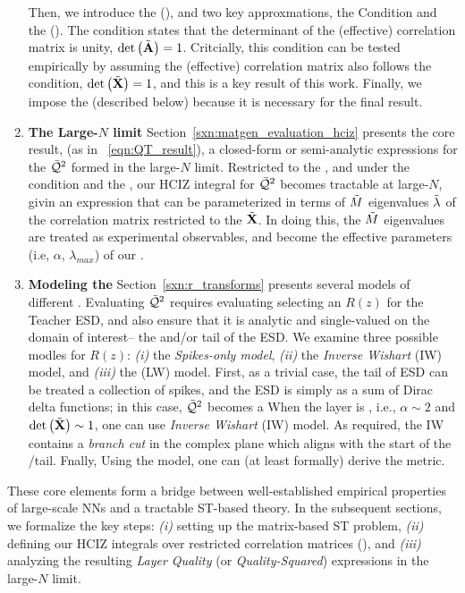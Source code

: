 \begin{enumerate}[label=5.\arabic*]
Then, we introduce the \EffectiveCorrelationSpace (\ECS), and two key approxmations,
the \TRACELOG Condition and the \IndependentFluctuationApproximation (\IFA).
The \TRACELOG condition states that the determinant of the (effective) \Student correlation matrix is unity, $\mbox{}{\text{det}}\left(\tilde{\mathbf{A}}\right)=1$.
Critcially, this condition can be tested empirically by assuming the (effective) \Teacher correlation matrix
also follows the \TRACELOG condition, $\mbox{}{\text{det}}\left(\tilde{\mathbf{X}}\right)=1$, and this is a key result of this work.
Finally, we impose the \IFA (described below) because it is necessary for the final result.

\item
\textbf{The Large-$N$ limit}
Section~\ref{sxn:matgen_evaluation_hciz} presents the core result,
(as in \EQN~\ref{eqn:QT_result}),
a closed-form or semi-analytic expressions for the \LayerQualitySquared $\bar{\mathcal{Q}}^{2}$
formed in the large-$N$ limit.
Restricted to the \ECS, and under  the \TRACELOG condition and the \IFA, our
HCIZ integral for $\bar{\mathcal{Q}}^{2}$ becomes tractable at large-$N$, givin an expression that can be parameterized
in terms of $\tilde{M}$ eigenvalues $\tilde{\lambda}$ of the \Teacher correlation matrix 
restricted to the \ECS $\tilde{\mathbf{X}}$.
In doing this, the $\tilde{M}$ \Teacher eigenvalues are treated as experimental observables, and 
become the effective \SemiEmpirical parameters (i.e, $\alpha$, $\lambda_{max}$) of our \SETOL.

\item
\textbf{Modeling the \HeavyTailed \RTransform}
Section~\ref{sxn:r_transforms} presents several  models of different \RTransforms.
Evaluating $\bar{\mathcal{Q}}^{2}$ requires evaluating selecting an \RTransform $R(z)$ for the Teacher ESD,
and also ensure that it is analytic and single-valued on the domain of interest-- the \ECS and/or tail of the ESD.
We examine three possible modles for $R(z)$: \emph{(i)} the \emph{Spikes-only model},
\emph{(ii)} the \emph{Inverse Wishart} (IW) model, 
and \emph{(iii)} the  \LevyWigner (LW) model.
First, as a trivial case, the tail of ESD can be treated a collection of spikes,
and the ESD is simply as a sum of Dirac delta functions; in this case,
$\bar{\mathcal{Q}}^{2}$ becomes a 
When the layer is \Ideal, i.e., $\alpha\sim 2$ and $\mbox{}{\text{det}}\left(\tilde{\mathbf{X}}\right)\sim 1$,
one can use  \emph{Inverse Wishart} (IW) model. 
As required, the IW \RTransform contains a \emph{branch cut} in the complex plane
which aligns with the start of the \ECS /\PowerLaw  tail.
Fnally, Using the \LevyWigner model, one can (at least formally) derive the \HTSR \ALPHAHAT metric.

\end{enumerate}

\vspace*{1em}

These core elements form a bridge between well-established empirical properties of large-scale NNs 
and a tractable ST-based theory. In the subsequent sections, we formalize the key steps: 
\emph{(i)} setting up the matrix-based ST problem, \emph{(ii)} defining our HCIZ integrals 
over restricted correlation matrices (\ECS), and \emph{(iii)} analyzing the resulting 
\emph{Layer Quality} (or \emph{Quality-Squared}) expressions in the large-$N$ limit.
